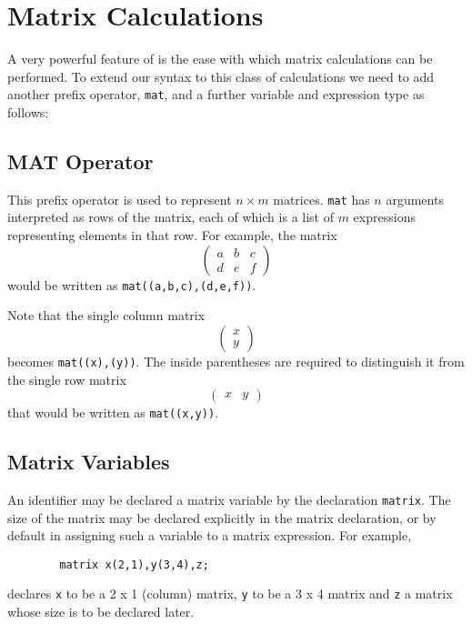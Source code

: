 \chapter{Matrix Calculations} 
A very powerful feature of {\REDUCE} is the ease with which matrix
calculations can be performed. To extend our syntax to this class of
calculations we need to add another prefix operator, \texttt{mat},
and a further variable and expression type as follows:

\section{MAT Operator}
\hypertarget{operator:MAT}{}
This prefix operator is used to represent $n\times m$ matrices. \texttt{mat}
has $n$ arguments interpreted as rows of the matrix, each of
which is a list of $m$ expressions representing elements in that row.
For example, the matrix
\[ \left( \begin{array}{lcr} a & b & c \\ d & e & f \end{array} \right) \]
would be written as \texttt{mat((a,b,c),(d,e,f))}.

Note that the single column matrix
\[ \left( \begin{array}{c} x \\ y \end{array} \right) \]
becomes \texttt{mat((x),(y))}.  The inside parentheses are required to
distinguish it from the single row matrix
\[ \left( \begin{array}{lr} x & y \end{array} \right) \]
that would be written as \texttt{mat((x,y))}.

\section{Matrix Variables}
\label{sec:core-matrix-variables}
\hypertarget{command:MATRIX}{}

An identifier may be declared a matrix variable by the declaration
\texttt{matrix}.
The size of the matrix may be declared explicitly in the matrix
declaration, or by default in assigning such a variable to a matrix
expression. For example,
\begin{verbatim}
        matrix x(2,1),y(3,4),z;
\end{verbatim}
declares \texttt{x} to be a 2 x 1 (column) matrix, \texttt{y} to be a 3 x 4
matrix and \texttt{z} a matrix whose size is to be declared later.

